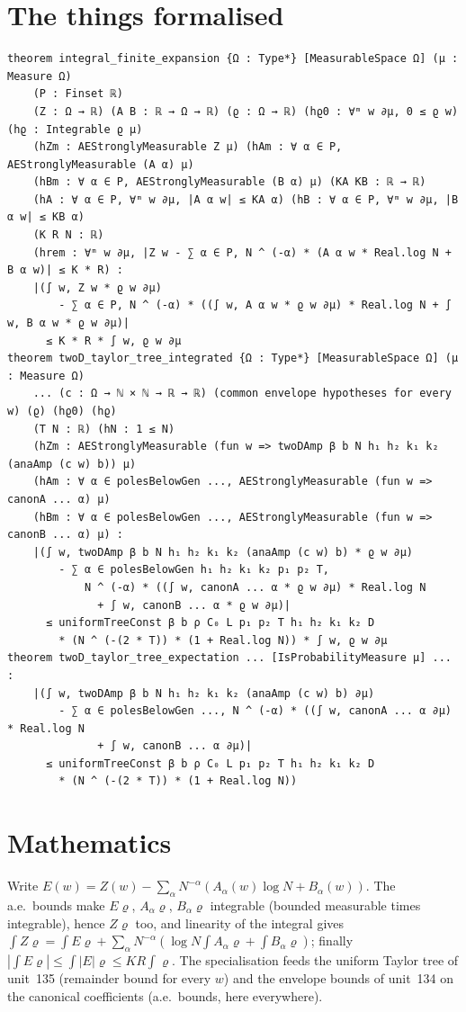 \documentclass[11pt]{article}
\begin{document}
\section{The things formalised}
{\small
\begin{verbatim}
theorem integral_finite_expansion {Ω : Type*} [MeasurableSpace Ω] (μ : Measure Ω)
    (P : Finset ℝ)
    (Z : Ω → ℝ) (A B : ℝ → Ω → ℝ) (ϱ : Ω → ℝ) (hϱ0 : ∀ᵐ w ∂μ, 0 ≤ ϱ w) (hϱ : Integrable ϱ μ)
    (hZm : AEStronglyMeasurable Z μ) (hAm : ∀ α ∈ P, AEStronglyMeasurable (A α) μ)
    (hBm : ∀ α ∈ P, AEStronglyMeasurable (B α) μ) (KA KB : ℝ → ℝ)
    (hA : ∀ α ∈ P, ∀ᵐ w ∂μ, |A α w| ≤ KA α) (hB : ∀ α ∈ P, ∀ᵐ w ∂μ, |B α w| ≤ KB α)
    (K R N : ℝ)
    (hrem : ∀ᵐ w ∂μ, |Z w - ∑ α ∈ P, N ^ (-α) * (A α w * Real.log N + B α w)| ≤ K * R) :
    |(∫ w, Z w * ϱ w ∂μ)
        - ∑ α ∈ P, N ^ (-α) * ((∫ w, A α w * ϱ w ∂μ) * Real.log N + ∫ w, B α w * ϱ w ∂μ)|
      ≤ K * R * ∫ w, ϱ w ∂μ
theorem twoD_taylor_tree_integrated {Ω : Type*} [MeasurableSpace Ω] (μ : Measure Ω)
    ... (c : Ω → ℕ × ℕ → ℝ → ℝ) (common envelope hypotheses for every w) (ϱ) (hϱ0) (hϱ)
    (T N : ℝ) (hN : 1 ≤ N)
    (hZm : AEStronglyMeasurable (fun w => twoDAmp β b N h₁ h₂ k₁ k₂ (anaAmp (c w) b)) μ)
    (hAm : ∀ α ∈ polesBelowGen ..., AEStronglyMeasurable (fun w => canonA ... α) μ)
    (hBm : ∀ α ∈ polesBelowGen ..., AEStronglyMeasurable (fun w => canonB ... α) μ) :
    |(∫ w, twoDAmp β b N h₁ h₂ k₁ k₂ (anaAmp (c w) b) * ϱ w ∂μ)
        - ∑ α ∈ polesBelowGen h₁ h₂ k₁ k₂ p₁ p₂ T,
            N ^ (-α) * ((∫ w, canonA ... α * ϱ w ∂μ) * Real.log N
              + ∫ w, canonB ... α * ϱ w ∂μ)|
      ≤ uniformTreeConst β b ρ C₀ L p₁ p₂ T h₁ h₂ k₁ k₂ D
        * (N ^ (-(2 * T)) * (1 + Real.log N)) * ∫ w, ϱ w ∂μ
theorem twoD_taylor_tree_expectation ... [IsProbabilityMeasure μ] ... :
    |(∫ w, twoDAmp β b N h₁ h₂ k₁ k₂ (anaAmp (c w) b) ∂μ)
        - ∑ α ∈ polesBelowGen ..., N ^ (-α) * ((∫ w, canonA ... α ∂μ) * Real.log N
              + ∫ w, canonB ... α ∂μ)|
      ≤ uniformTreeConst β b ρ C₀ L p₁ p₂ T h₁ h₂ k₁ k₂ D
        * (N ^ (-(2 * T)) * (1 + Real.log N))
\end{verbatim}
}

\section{Mathematics}

Write $E(w)=Z(w)-\sum_\alpha N^{-\alpha}(A_\alpha(w)\log N+B_\alpha(w))$. The a.e.\ bounds make
$E\varrho$, $A_\alpha\varrho$, $B_\alpha\varrho$ integrable (bounded measurable times integrable),
hence $Z\varrho$ too, and linearity of the integral gives
$\int Z\varrho=\int E\varrho+\sum_\alpha N^{-\alpha}(\log N\int A_\alpha\varrho+\int B_\alpha\varrho)$;
finally $|\int E\varrho|\le\int|E|\varrho\le KR\int\varrho$. The specialisation feeds the uniform
Taylor tree of unit~135 (remainder bound for every $w$) and the envelope bounds of unit~134 on the
canonical coefficients (a.e.\ bounds, here everywhere).
\end{document}
